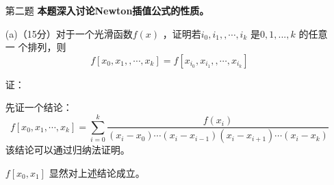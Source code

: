 \documentclass[12pt,a4paper,utf8]{ctexart}
\begin{document}
\begin{enumerate}
\begin{lstlisting}[frame=single]
   err_max=zeros(1,7);% 初始化误差
   n2=[];% n2储存n值
   for exp=4:10
       n = 2^exp;% 定义n
       x = [-1:2/n:1];% 得到区间端点x_i
       % 得到h_i
       h=[];
       for i=1:n
           h=[h x(i+1)-x(i)];
       end 
       y=sin(4.*x.^2)+(sin(4.*x)).^2; % 得到y_i
       % 初始化lambda,mu,d
       lambda=ones(n,1);
       mu=ones(n,1);
       d=ones(n,1);
       % 对除端点的lambda,mu,d赋值
       for i=2:n
           lambda(i-1)=h(i)/(h(i)+h(i-1));
           mu(i-1)=1-lambda(i-1);
           d(i-1)=6/(h(i)+h(i-1))*((y(i+1)-y(i))/h(i) ... 
           -(y(i)-y(i-1))/h(i-1));
       end
       % 对端点的lambda,mu,d赋值
       d(n)=6/(h(1)+h(n))*((y(2)-y(1))/h(1) - (y(n+1)-y(n))/h(n));
       lambda(n)=h(1)/(h(1)+h(n));
       mu(n)=1-lambda(n);
       lambda2=lambda;
       lambda2(n)=[];
       mu2=mu;
       mu2(1)=[];
       % 得到求解M的系数矩阵A
       A=diag(mu2,-1)+2.*eye(n)+diag(lambda2,1);
       A(1,n)=mu(1);
       A(n,1)=lambda(n);
       M=A\d; 
       M=[M(n);M];%得到M
       x2=[-1:2/1999:1];% 分割2000个插值点
       S=zeros(1,size(x2,1));% 初始化S
       % 通过式(1)得到分段函数S
       for i=1:n
           S=S+ ...
               (((x(i+1)-x2).^3*M(i)+(x2-x(i)).^3*M(i+1))/6/h(i) ...
               +((x(i+1)-x2)*y(i)+(x2-x(i))*y(i+1))/h(i) ...
               -(h(i)/6)*((x(i+1)-x2)*M(i)+(x2-x(i))*M(i+1)) ...
               ).*(x2>x(i)&x2<=x(i+1));
       end
       % 单独得到S(1)
       S(1)= ... 
         ((x(1+1)-x2(1)).^3*M(1)+(x2(1)-x(1)).^3*M(1+1))/6/h(1) ...
         +((x(1+1)-x2(1))*y(1)+(x2(1)-x(1))*y(1+1))/h(1) ...
         -(h(1)/6)*((x(1+1)-x2(1))*M(1)+(x2(1)-x(1))*M(1+1));
       y2=sin(4.*x2.^2)+(sin(4.*x2)).^2;% 真实值
       err_max(exp-3)=max(abs(y2-S));% 计算误差并保存
       n2=[n2 2^exp];
   end
   % 打印err_max结果
   err_max 
   % 画图
   figure
   loglog(n2,err_max,'-')
\end{lstlisting}

\newpage
\item[第二题]\textbf{本题深入讨论Newton插值公式的性质。}  

(a)（15分）对于一个光滑函数$ f(x) $ ，证明若$ {i_0, i_1,,\cdots , i_k} $ 是$ {0, 1, ..., k} $ 的任意一
个排列，则
$$f[x_0, x_1,,\cdots , x_k] = f[x_{i_0}, x_{i_1},,\cdots , x_{i_k}]$$ 

证：

先证一个结论：
$$ f[x_0, x_1,\cdots , x_k]=\sum_{i=0}^{k} \frac{f(x_i)}{(x_i-x_0)\cdots (x_{i}-x_{i-1})(x_{i}-x_{i+1})\cdots (x_i-x_k) }  $$
该结论可以通过归纳法证明。

$ f[x_0,x_1] $ 显然对上述结论成立。


\end{enumerate}
\end{document}
